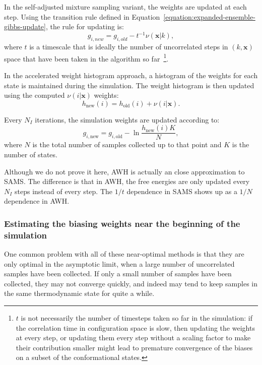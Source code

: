 \documentclass[9pt,review]{livecoms}
\newcommand{\vx}{\mathbf{x}}
\begin{document}
In the self-adjusted mixture sampling variant, the weights are updated at each step. Using the transition rule defined in Equation~\ref{equation:expanded-ensemble-gibbs-update}, the rule for updating is:
\begin{equation}
g_{i,new} = g_{i,old} - t^{-1}\nu(\vx|k),
\end{equation}
where $t$ is a timescale that is ideally the number of uncorrelated steps in $(k,\vx)$ space that have been taken in the algorithm so far~\footnote{$t$ is not necessarily the number of timesteps taken so far in the simulation: if the correlation time in configuration space is slow, then updating the weights at every step, or updating them every step without a scaling factor to make their contribution smaller might lead to premature convergence of the biases on a subset of the conformational states.}.

In the accelerated weight histogram approach, a histogram of the weights for each state is maintained during the simulation. The weight histogram is then updated using the computed $\nu(i|\vx)$ weights:
\begin{equation}
h_{\mathrm{new}}(i) = h_{\mathrm{old}}(i) + \nu(i|\vx).
\label{eq:awh-weight-histogram}
\end{equation}

Every $N_I$ iterations, the simulation weights are updated according to:
\begin{equation}
g_{i,\mathrm{new}} = g_{i,\mathrm{old}} - \ln{\frac{h_{\mathrm{new}}(i)K}{N}},
\label{eq:awh_free_energy_up}
\end{equation}
where $N$ is the total number of samples collected up to that point and $K$ is the number of states.


Although we do not prove it here, AWH is actually an close approximation to SAMS. The difference is that in AWH, the free energies are only updated every $N_I$ steps instead of every step. The $1/t$ dependence in SAMS shows up as a $1/N$ dependence in AWH.

\subsubsection{Estimating the biasing weights near the beginning of the simulation}

One common problem with all of these near-optimal methods is that they are only optimal in the asymptotic limit, when a large number of uncorrelated samples have been collected.  If only a small number of samples have been collected, they may not converge quickly, and indeed may tend to keep samples in the same thermodynamic state for quite a while.
\end{document}
